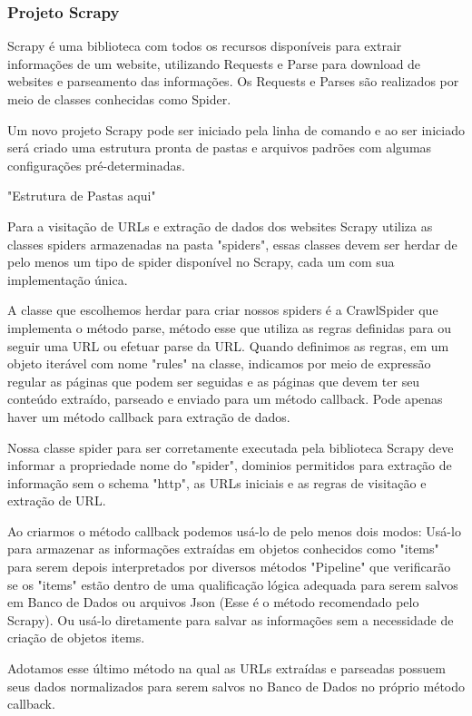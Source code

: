 \documentclass[12pt]{article}
\begin{document}
\subsubsection{Projeto Scrapy}

Scrapy é uma biblioteca com todos os recursos disponíveis para extrair informações de um website, utilizando Requests e Parse para download de websites e parseamento das informações. Os Requests e Parses são realizados por meio de classes conhecidas como Spider.

Um novo projeto Scrapy pode ser iniciado pela linha de comando e ao ser iniciado será criado uma estrutura pronta de pastas e arquivos padrões com algumas configurações pré-determinadas.
 
"Estrutura de Pastas aqui"

Para a visitação de URLs e extração de dados dos websites Scrapy utiliza as classes spiders armazenadas na pasta "spiders", essas classes devem ser herdar de pelo menos um tipo de spider disponível no Scrapy, cada um com sua implementação única.

A classe que escolhemos herdar para criar nossos spiders é a CrawlSpider que implementa o método parse, método esse que utiliza as regras definidas para ou seguir uma URL ou efetuar parse da URL. Quando definimos as regras, em um objeto iterável com nome "rules" na classe, indicamos por meio de expressão regular as páginas que podem ser seguidas e as páginas que devem ter seu conteúdo extraído, parseado e enviado para um método callback. Pode apenas haver um método callback para extração de dados.

Nossa classe spider para ser corretamente executada pela biblioteca Scrapy deve informar a propriedade nome do "spider", dominios permitidos para extração de informação sem o schema "http", as URLs iniciais e as regras de visitação e extração de URL.

Ao criarmos o método callback podemos usá-lo de pelo menos dois modos: Usá-lo para armazenar as informações extraídas em objetos conhecidos como "items" para serem depois interpretados por diversos métodos "Pipeline" que verificarão se os "items" estão dentro de uma qualificação lógica adequada para serem salvos em Banco de Dados ou arquivos Json (Esse é o método recomendado pelo Scrapy). Ou usá-lo diretamente para salvar as informações sem a necessidade de criação de objetos items.

Adotamos esse último método na qual as URLs extraídas e parseadas possuem seus dados normalizados para serem salvos no Banco de Dados no próprio método callback.
 
\end{document}
